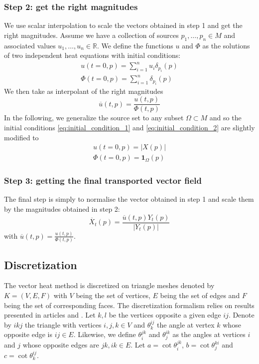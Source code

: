 \documentclass[sigconf]{acmart}
\begin{document}
\subsubsection{Step 2: get the right magnitudes}
We use scalar interpolation to scale the vectors obtained in step 1 and get the right magnitudes. Assume we have a collection of sources
$p_1, \dots, p_n \in M$ and associated values $u_1, \dots, u_n \in \mathbb{R}$. We define the functions $u$ and $\Phi$ 
as the solutions of two independent heat equations with initial conditions:
\begin{align}
  u(t = 0, p) = \sum_{i = 1}^nu_i\delta_{p_i}(p) \label{eq:initial_condition_1}\\
  \Phi(t = 0, p) = \sum_{i=1}^n\delta_{p_i}(p) \label{eq:initial_condition_2}
\end{align}
We then take as interpolant of the right magnitudes 
\begin{equation}
  \overline{u}(t,p) = \frac{u(t,p)}{\Phi(t,p)}
\end{equation}
In the following, we generalize the source set to any subset $\Omega \subset M$
and so the initial conditions \ref{eq:initial_condition_1} and \ref{eq:initial_condition_2}
are slightly modified to 
\begin{align*}
  u(t=0, p) = | X(p) | \\
  \Phi(t=0, p) = \mathbf{1}_{\Omega}(p)
\end{align*}

\subsubsection{Step 3: getting the final transported vector field}
The final step is simply to normalise the vector obtained in step 1 and scale them by the magnitudes obtained in step 2: 
$$\overline{X}_t(p) = \frac{\overline{u}(t,p)Y_t(p)}{|Y_t(p)|}$$ with $\overline{u}(t,p) = \frac{u(t,p)}{\Phi(t, p)}$.

\subsection{Discretization}
The vector heat method is discretized on triangle meshes denoted by $K = (V, E, F)$
with $V$ being the set of vertices, $E$ being the set of edges and $F$ 
being the set of corresponding faces. The discretization formalism relies 
on results presented in articles \cite{10.1145/2461912.2462005} and \cite{Knoppel:2015:SPS}. Let $k,l$ be the vertices opposite 
a given edge $ij$. Denote by $ikj$ the triangle with vertices $i, j, k \in V$ and $\theta_k^{ij}$ the angle at 
vertex $k$ whose opposite edge is $ij\in E$. Likewise, we define $\theta_i^{jk}$ 
and $\theta_j^{ik}$ as the angles at vertices $i$ and $j$ whose opposite edges are $jk, ik \in E$. 
Let $a = \cot \theta_i^{jk}$, $b = \cot \theta_j^{ki}$ and $c = \cot \theta_k^{ij}$. 
\end{document}
